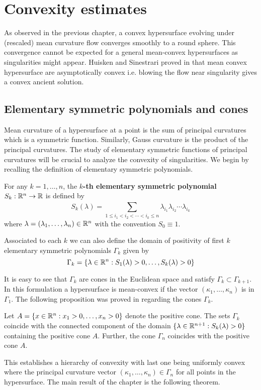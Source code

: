 \chapter{Convexity estimates}

As observed in the previous chapter, a convex hypersurface evolving under (rescaled) mean curvature flow converges smoothly to a round sphere. This convergence cannot be expected for a general mean-convex hypersurfaces as singularities might appear. Huisken and Sinestrari proved in \cite{huisken1999convexity, huisken1999mean} that mean convex hypersurface are asymptotically convex i.e. blowing the flow near singularity gives a convex ancient solution.



\section{Elementary symmetric polynomials and cones}

Mean curvature of a hypersurface at a point is the sum of principal curvatures which is a symmetric function. Similarly, Gauss curvature is the product of the principal curvatures. The study of elementary symmetric functions of principal curvatures will be crucial to analyze the convexity of singularities. We begin by recalling the definition of elementary symmetric polynomials.

\begin{defn}
    For any $ k=1, \ldots, n $, the \textbf{$ k $-th elementary symmetric polynomial}   $ S_{k} :\mathbb{R}^{n} \to \mathbb{R} $  is defined by
    \[ S_{k}(\lambda) = \sum_{1\le i_{1}< i_{2}< \cdots < i_{k}\le n}^{}\lambda_{i_{1}}\lambda_{i_{2}} \cdots \lambda_{i_{k}} \]
    where $ \lambda = (\lambda_{1}, \ldots, \lambda_{n}) \in \mathbb{R}^{n}$ with the convention $ S_{0} \equiv 1$. 
\end{defn}

Associated to each $ k $ we can also define the domain of positivity of first $ k $ elementary symmetric polynomials $ \Gamma_{k} $ given by 
\[ \Gamma_{k} = \{\lambda \in \mathbb{R}^{n} : S_{1}(\lambda) >0, \ldots , S_{k}(\lambda) >0\} \]

It is easy to see that $ \Gamma_{k} $ are cones in the Euclidean space and satisfy $ \Gamma_{k} \subset \Gamma_{k+1} $. In this formulation a hypersurface is mean-convex if the vector $ (\kappa_{1}, \ldots, \kappa_{n}) $ is in $ \Gamma_{1} $. The following proposition was proved in \cite{huisken1999convexity} regarding the cones $ \Gamma_{k} $. 
\begin{proposition}
    Let $ A = \{x \in \mathbb{R}^{n} : x_{1}>0, \ldots, x_{n}>0 \} $ denote the positive cone. The sets $ \Gamma_{k} $ coincide with the connected component of the domain $ \{\lambda \in \mathbb{R}^{n+1} : S_{k}(\lambda)>0\} $ containing the positive cone $ A $. Further, the cone $ \Gamma_{n} $ coincides with the positive cone $ A $.
\end{proposition}
This establishes a hierarchy of convexity with last one being uniformly convex where the principal curvature vector $ (\kappa_{1}, \ldots, \kappa_{n}) \in \Gamma_{n} $ for all points in the hypersurface. The main result of the chapter is the following theorem. 

